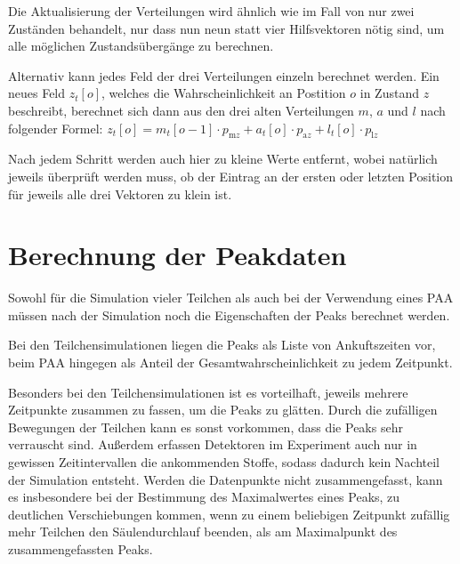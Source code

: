 Die Aktualisierung der Verteilungen wird ähnlich wie im Fall von nur zwei Zuständen behandelt, nur dass nun neun statt vier Hilfsvektoren nötig sind, um alle möglichen Zustandsübergänge zu berechnen. 

Alternativ kann jedes Feld der drei Verteilungen einzeln berechnet werden. Ein neues Feld $z_t[o]$, welches die Wahrscheinlichkeit an Postition $o$ in Zustand $z$ beschreibt, berechnet sich dann aus den drei alten Verteilungen $m$, $a$ und $l$ nach folgender Formel:
$z_t[o] = m_t[o-1] \cdot p_{\text{m}z} + a_t[o] \cdot p_{\text{a}z} + l_t[o] \cdot p_{\text{l}z} $


Nach jedem Schritt werden auch hier zu kleine Werte entfernt, wobei natürlich jeweils überprüft werden muss, ob der Eintrag an der ersten oder letzten Position für jeweils alle drei Vektoren zu klein ist.

% 


\section{Berechnung der Peakdaten}
Sowohl für die Simulation vieler Teilchen als auch bei der Verwendung eines PAA müssen nach der Simulation noch die Eigenschaften der Peaks berechnet werden. 

Bei den Teilchensimulationen liegen die Peaks als Liste von Ankuftszeiten vor, beim PAA hingegen als Anteil der Gesamtwahrscheinlichkeit zu jedem Zeitpunkt. 

Besonders bei den Teilchensimulationen ist es vorteilhaft, jeweils mehrere Zeitpunkte zusammen zu fassen, um die Peaks zu glätten. Durch die zufälligen Bewegungen der Teilchen kann es sonst vorkommen, dass die Peaks sehr verrauscht sind. Außerdem erfassen Detektoren im Experiment auch nur in gewissen Zeitintervallen die ankommenden Stoffe, sodass dadurch kein Nachteil der Simulation entsteht.
Werden die Datenpunkte nicht zusammengefasst, kann es insbesondere bei der Bestimmung des Maximalwertes eines Peaks, zu deutlichen Verschiebungen kommen, wenn zu einem beliebigen Zeitpunkt zufällig mehr Teilchen den Säulendurchlauf beenden, als am Maximalpunkt des zusammengefassten Peaks.

